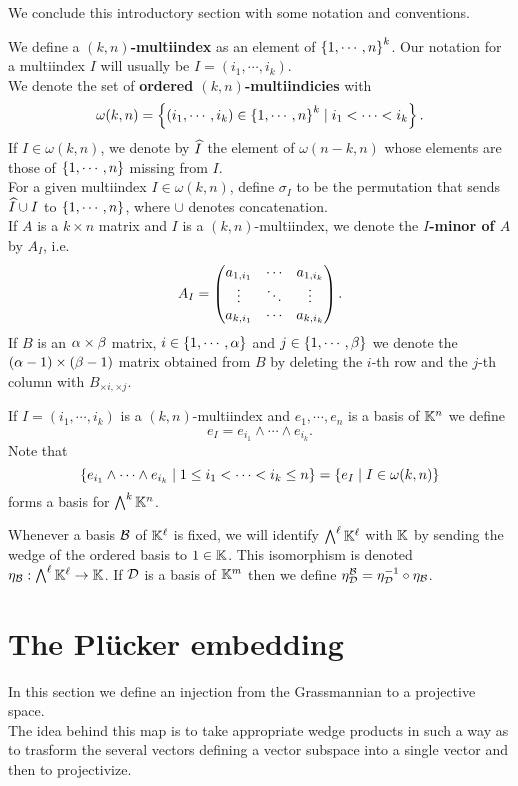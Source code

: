 \noindent We conclude this introductory section with some notation and conventions.
\begin{definition}[Multiindicies]
We define a \textbf{$(k,n)$-multiindex} as an element of $\left\{{1,\cdots, n}\right\}^k$. Our notation for a multiindex $I$ will usually be $I=(i_1,\cdots, i_k)$.\\
We denote the set of \textbf{ordered $(k,n)$-multiindicies} with
\[\omega(k,n)=\left\{{(i_1,\cdots, i_k)\in \left\{{1,\cdots, n}\right\}^k\mid i_1<\cdots<i_k}\right\}.\]
If $I\in \omega(k,n)$, we denote by $\widehat{I}$ the element of $\omega(n-k,n)$ whose elements are those of $\left\{{1,\cdots, n}\right\}$ missing from $I$.\\
For a given multiindex $I\in\omega(k,n)$, define $\sigma_I$ to be the permutation that sends $\widehat{I}\cup I$ to $\left\{{1,\cdots, n}\right\}$, where $\cup$ denotes concatenation.\\
If $A$ is a $k\times n$ matrix and $I$ is a $(k,n)$-multiindex, we denote the \textbf{$I$-minor of $A$} by $A_I$, i.e.
\[A_I=\begin{pmatrix}a_{1,i_1} &\cdots &a_{1,i_{k}}\\\vdots &\ddots &\vdots\\a_{k,i_1}&\cdots&a_{k,i_k}\end{pmatrix}.\]
If $B$ is an $\alpha\times \beta$ matrix, $i\in\left\{{1,\cdots, \alpha}\right\}$ and $j\in \left\{{1,\cdots, \beta}\right\}$ we denote the $(\alpha-1)\times (\beta-1)$ matrix obtained from $B$ by deleting the $i$-th row and the $j$-th column with $B_{\times i,\times j}$.
\end{definition}

\begin{remark}
If $I=(i_1,\cdots, i_k)$ is a $(k,n)$-multiindex and $e_1,\cdots,e_n$ is a basis of $\mathbb{K}^n$ we define
\[e_I=e_{i_1}\wedge\cdots\wedge e_{i_k}.\]
Note that
\[\left\{{e_{i_1}\wedge\cdots\wedge e_{i_k}\mid 1\leq i_1<\cdots<i_k\leq n}\right\}=\left\{{e_I\mid I\in \omega(k,n)}\right\}\]
forms a basis for $\bigwedge^k\mathbb{K}^n$.
\end{remark}

\begin{notation}
Whenever a basis $\mathcal{B}$ of $\mathbb{K}^\ell$ is fixed, we will identify $\bigwedge^\ell\mathbb{K}^\ell$ with $\mathbb{K}$ by sending the wedge of the ordered basis to $1\in\mathbb{K}$. This isomorphism is denoted $\eta_{\mathcal{B}}:\bigwedge^\ell\mathbb{K}^\ell\to \mathbb{K}$. If $\mathcal{D}$ is a basis of $\mathbb{K}^m$ then we define $\eta^{\mathcal{B}}_{\mathcal{D}}=\eta_{\mathcal{D}}^{-1}\circ \eta_{\mathcal{B}}$.
\end{notation}

\section{The Pl\"ucker embedding}
In this section we define an injection from the Grassmannian to a projective space.\\
The idea behind this map is to take appropriate wedge products in such a way as to trasform the several vectors defining a vector subspace into a single vector and then to projectivize.

